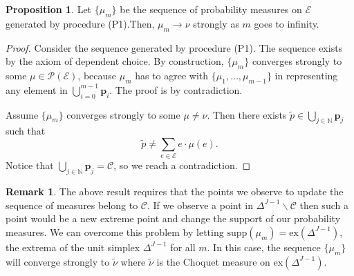 \documentclass[12pt, reqno]{amsart}
\theoremstyle{definition}
\newtheorem{proposition}[theorem]{Proposition}
\newtheorem{remark}{Remark}
\begin{document}

\begin{proposition}\label{empchoq}
Let $\{\mu_m \}$ be the sequence of probability measures on $\mathscr{E}$ generated by procedure (P1).Then, $\mu_m \rightarrow \nu$ strongly as $m$ goes to infinity.
\end{proposition}
\begin{proof}
Consider the sequence generated by procedure (P1).  The sequence exists by the axiom of dependent choice. By construction, $\{\mu_m\}$ converges strongly to some $\mu \in \mathscr{P}(\mathscr{E})$, because $\mu_m$ has to agree with $\{\mu_1,\ldots,\mu_{m-1}\}$ in representing any element in $\bigcup_{i=0}^{m-1}\mathbf{p}_i$. The proof is by contradiction.

Assume  $\{\mu_m\}$  converges strongly to some $\mu \neq \nu$. Then there exists $\widetilde{p} \in  \bigcup\limits_{j \in \mathbb{N}} \mathbf{p}_j$ such that
$$\widetilde{p} \neq \sum\limits_{e \in \mathscr{E}} e \cdot \mu(e) \text{.}$$
Notice that $\bigcup_{j \in \mathbb{N}} \mathbf{p}_j=\mathscr{C}$, so we reach a contradiction.
 \end{proof}
\begin{remark}
The above result requires that the points we observe to update the sequence of measures belong to $\mathscr{C}$. If  we observe a point  in $\Delta^{J-1} \backslash \mathscr{C}$ then such a point would be a new extreme point and
change the support of our probability measures. We can overcome this problem by letting $\text{supp}(\mu_m)=\text{ex}(\Delta^{J-1})$, the extrema of the unit simplex $\Delta^{J-1}$ for all $m$. In this case, the sequence
$\{\mu_m\}$ will converge strongly to $\tilde{\nu}$ where $\tilde{\nu}$ is the Choquet measure on $\text{ex}(\Delta^{J-1})$.
\end{remark}
\end{document}

